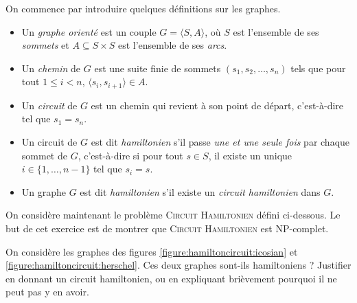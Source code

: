 \begin{exercice}[\textsc{Circuit Hamiltonien} est NP-complet%
    \footnote{Vidéo détaillée de la réduction de \textsc{3-SAT} à \textsc{Cycle Hamiltonien} : \url{https://www.youtube.com/watch?v=OHnX-R_SBpM}}]
  \label{exo:reductions/complexity/hamiltonian}

  On commence par introduire quelques définitions sur les graphes.
  \begin{itemize}
  \item Un \emph{graphe orienté} est un couple $G = \langle S, A \rangle$,
    où $S$ est l'ensemble de ses \emph{sommets}
    et $A \subseteq S \times S$ est l'ensemble de ses \emph{arcs}.
  \item Un \emph{chemin} de $G$ est une suite finie de sommets $(s_1, s_2, \dots, s_n)$
    tels que pour tout $1 \le i < n$, $\langle s_i, s_{i+1} \rangle \in A$.
  \item Un \emph{circuit} de $G$ est un chemin qui revient à son point de départ, c'est-à-dire tel que $s_1 = s_n$.
  \item Un circuit de $G$ est dit \emph{hamiltonien} s'il passe \emph{une et une seule fois} par chaque sommet de $G$,
    c'est-à-dire si pour tout $s\in S$, il existe un unique $i \in \{1, \dots, n-1\}$ tel que $s_i = s$.
  \item Un graphe $G$ est dit \emph{hamiltonien} s'il existe un \emph{circuit hamiltonien} dans $G$.
  \end{itemize}

  On considère maintenant le problème \textsc{Circuit Hamiltonien} défini ci-dessous.
  Le but de cet exercice est de montrer que \textsc{Circuit Hamiltonien} est NP-complet.


  \begin{questions}
  \item On considère les graphes des figures \ref{figure:hamiltoncircuit:icosian} et \ref{figure:hamiltoncircuit:herschel}.
    Ces deux graphes sont-ils hamiltoniens ?
    Justifier en donnant un circuit hamiltonien, ou en expliquant brièvement pourquoi il ne peut pas y en avoir.
  \end{questions}

  \begin{figure}[h]%
    \centering
    \icosian%
    \herschel%
  \end{figure}

  \ifcorrection{\newpage}


\end{exercice}
